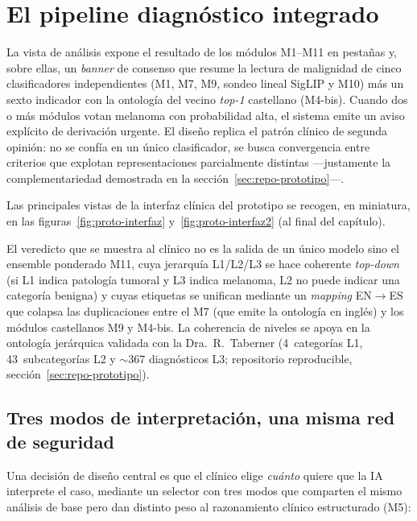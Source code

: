 \section{El pipeline diagnóstico integrado}
\label{sec:proto-pipeline}

La vista de análisis expone el resultado de los módulos M1--M11 en
pestañas y, sobre ellas, un \emph{banner} de consenso que resume la
lectura de malignidad de cinco clasificadores independientes (M1, M7, M9,
sondeo lineal SigLIP y M10) más un sexto indicador con la ontología del
vecino \emph{top-1} castellano (M4-bis). Cuando dos o más módulos votan
melanoma con probabilidad alta, el sistema emite un aviso explícito de
derivación urgente. El diseño replica el patrón clínico de segunda
opinión: no se confía en un único clasificador, se busca convergencia
entre criterios que explotan representaciones parcialmente distintas
---justamente la complementariedad demostrada en la
sección~\ref{sec:repo-prototipo}---.

Las principales vistas de la interfaz clínica del prototipo se recogen, en
miniatura, en las figuras~\ref{fig:proto-interfaz}
y~\ref{fig:proto-interfaz2} (al final del capítulo).

El veredicto que se muestra al clínico no es la salida de un único modelo
sino el ensemble ponderado M11, cuya jerarquía L1/L2/L3 se hace coherente
\emph{top-down} (si L1 indica patología tumoral y L3 indica melanoma, L2
no puede indicar una categoría benigna) y cuyas etiquetas se unifican
mediante un \emph{mapping} EN$\to$ES que colapsa las duplicaciones entre
el M7 (que emite la ontología en inglés) y los módulos castellanos M9 y
M4-bis. La coherencia de niveles se apoya en la ontología jerárquica
validada con la Dra.~R.~Taberner (4~categorías L1, 43~subcategorías L2 y
$\sim$367 diagnósticos L3; repositorio reproducible,
sección~\ref{sec:repo-prototipo}).

\subsection{Tres modos de interpretación, una misma red de seguridad}
\label{sec:proto-modos}

Una decisión de diseño central es que el clínico elige \emph{cuánto}
quiere que la IA interprete el caso, mediante un selector con tres modos
que comparten el mismo análisis de base pero dan distinto peso al
razonamiento clínico estructurado (M5):

